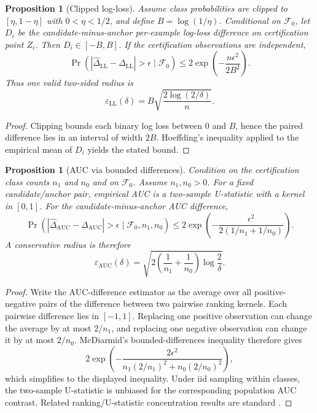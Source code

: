 \documentclass[10pt]{article}
\newcommand{\AUC}{\mathrm{AUC}}
\newcommand{\LL}{\mathrm{LL}}
\newtheorem{proposition}[theorem]{Proposition}
\begin{document}
\begin{proposition}[Clipped log-loss]
\label{prop:logloss}
Assume class probabilities are clipped to $[\eta,1-\eta]$ with $0<\eta<1/2$, and define $B=\log(1/\eta)$. Conditional on $\mathcal F_0$, let $D_i$ be the candidate-minus-anchor per-example log-loss difference on certification point $Z_i$. Then $D_i\in[-B,B]$. If the certification observations are independent,
\[
\Pr\left(
|\widehat\Delta_{\LL}-\Delta_{\LL}|>\epsilon
\mid\mathcal F_0
\right)
\le 2\exp\left(-\frac{n\epsilon^2}{2B^2}\right).
\]
Thus one valid two-sided radius is
\[
\varepsilon_{\LL}(\delta)
= B\sqrt{\frac{2\log(2/\delta)}{n}}.
\]
\end{proposition}

\begin{proof}
Clipping bounds each binary log loss between $0$ and $B$, hence the paired difference lies in an interval of width $2B$. Hoeffding's inequality applied to the empirical mean of $D_i$ yields the stated bound.
\end{proof}

\begin{proposition}[AUC via bounded differences]
\label{prop:auc}
Condition on the certification class counts $n_1$ and $n_0$ and on $\mathcal F_0$. Assume $n_1,n_0>0$. For a fixed candidate/anchor pair, empirical AUC is a two-sample U-statistic with a kernel in $[0,1]$. For the candidate-minus-anchor AUC difference,
\[
\Pr\left(
|\widehat\Delta_{\AUC}-\Delta_{\AUC}|>\epsilon
\mid \mathcal F_0,n_1,n_0
\right)
\le
2\exp\left(
-\frac{\epsilon^2}{2(1/n_1+1/n_0)}
\right).
\]
A conservative radius is therefore
\[
\varepsilon_{\AUC}(\delta)
=
\sqrt{2\left(\frac1{n_1}+\frac1{n_0}\right)\log\frac{2}{\delta}}.
\]
\end{proposition}

\begin{proof}
Write the AUC-difference estimator as the average over all positive-negative pairs of the difference between two pairwise ranking kernels. Each pairwise difference lies in $[-1,1]$. Replacing one positive observation can change the average by at most $2/n_1$, and replacing one negative observation can change it by at most $2/n_0$. McDiarmid's bounded-differences inequality therefore gives
\[
2\exp\left(
-\frac{2\epsilon^2}{n_1(2/n_1)^2+n_0(2/n_0)^2}
\right),
\]
which simplifies to the displayed inequality. Under iid sampling within classes, the two-sample U-statistic is unbiased for the corresponding population AUC contrast. Related ranking/U-statistic concentration results are standard \citep{clemencon2008ranking}.
\end{proof}
\end{document}
